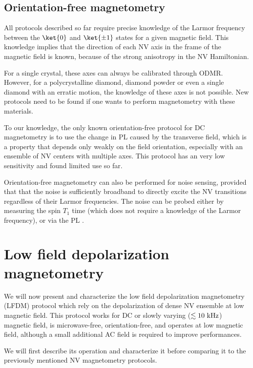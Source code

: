 \documentclass[a4paper,11pt]{report}
\begin{document}
\subsection{Orientation-free magnetometry}
All protocols described so far require precise knowledge of the Larmor frequency between the $\ket{0}$ and $\ket{\pm 1}$ states for a given magnetic field. This knowledge implies that the direction of each NV axis in the frame of the magnetic field is known, because of the strong anisotropy in the NV Hamiltonian. 

For a single crystal, these axes can always be calibrated through ODMR. However, for a polycrystalline diamond, diamond powder or even a single diamond with an erratic motion, the knowledge of these axes is not possible. New protocols need to be found if one wants to perform magnetometry with these materials.

To our knowledge, the only known orientation-free protocol for DC magnetometry is to use the change in PL caused by the transverse field, which is a property that depends only weakly on the field orientation, especially with an ensemble of NV centers with multiple axes. This protocol has an very low sensitivity and found limited use so far\citep{rondin2012nanoscale, tetienne2012magnetic, maletinsky2012robust, chapman2013background, jones2020selective}.

Orientation-free magnetometry can also be performed for noise sensing, provided that that the noise is sufficiently broadband to directly excite the NV transitions regardless of their Larmor frequencies. The noise can be probed either by measuring the spin $T_1$ time \citep{kolkowitz2015probing, andersen2019electron} (which does not require a knowledge of the Larmor frequency), or via the PL \citep{finco2021imaging}.

\section{Low field depolarization magnetometry}
\label{sec LFDM}
We will now present and characterize the low field depolarization magnetometry (LFDM) protocol which rely on the depolarization of dense NV ensemble at low magnetic field. This protocol works for DC or slowly varying ($\lesssim 10\ \rm kHz$) magnetic field, is microwave-free, orientation-free, and operates at low magnetic field, although a small additional AC field is required to improve performances.

We will first describe its operation and characterize it before comparing it to the previously mentioned NV magnetometry protocols.
\end{document}
